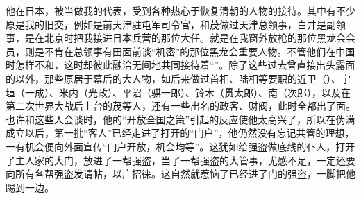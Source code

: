 他在日本，被当做我的代表，受到各种热心于恢复清朝的人物的接待。其中有不少原是我的旧交，例如是前天津驻屯军司令官，和茂做过天津总领事，白井是副领事，是在北京时把我接进日本兵营的那位大任。就是在我窗外放枪的那位黑龙会会员，则是不肯在总领事有田面前谈“机密”的那位黑龙会重要人物。不管他们在中国时怎样不和，这时却彼此融洽无间地共同接待着“”。除了这些过去曾直接出头露面的以外，那些原居于幕后的大人物，如后来做过首相、陆相等要职的近卫（）、宇垣（一成）、米内（光政）、平沼（骐一郎）、铃木（贯太郎）、南（次郎），以及在第二次世界大战后上台的茂等人，还有一些出名的政客、财阀，此时全都出了面。也许和这些人会谈时，他的“开放全国之策”引起的反应使他太高兴了，所以在伪满成立以后，第一批“客人”已经走进了打开的“门户”，他仍然没有忘记共管的理想，一有机会便向外面宣传“门户开放，机会均等”。这犹如给强盗做底线的仆人，打开了主人家的大门，放进了一帮强盗，当了一帮强盗的大管事，尤感不足，一定还要向所有各帮强盗发请帖，以广招徕。这自然就惹恼了已经进了门的强盗，一脚把他踢到一边。
